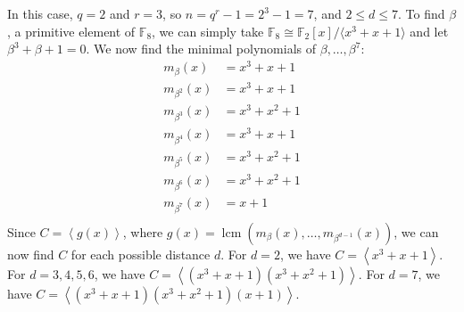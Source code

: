\documentclass[11pt]{article}
\DeclareMathOperator{\lcm}{lcm}
\def\F{\mathbb{F}}
\begin{document}
\section{} %
In this case, $q=2$ and $r=3$, so $n=q^r-1=2^3-1=7$, and $2\le d\le7$.
To find $\beta$, a primitive element of $\F_8$, we can simply take $\F_8\cong\F_2\left[x\right]/\langle x^3+x+1\rangle$ and let $\beta^3+\beta+1=0$.
\newline
\newline
We now find the minimal polynomials of $\beta,\ldots,\beta^7$:
\begin{align*}
	m_\beta(x) &= x^3+x+1\\
	m_{\beta^2}(x) &= x^3+x+1\\
	m_{\beta^3}(x) &= x^3+x^2+1\\
	m_{\beta^4}(x) &= x^3+x+1\\
	m_{\beta^5}(x) &= x^3+x^2+1\\
	m_{\beta^6}(x) &= x^3+x^2+1\\
	m_{\beta^7}(x) &= x+1\\
\end{align*}
\newline
\newline
Since $C=\left\langle g(x)\right\rangle$, where $g(x)=\lcm(m_\beta(x),\ldots,m_{\beta^{d-1}}(x))$, we can now find $C$ for each possible distance $d$.
\newline
\newline
For $d=2$, we have $C=\left\langle x^3+x+1\right\rangle$.
For $d=3,4,5,6$, we have $C=\left\langle (x^3+x+1)(x^3+x^2+1)\right\rangle$.
For $d=7$, we have $C=\left\langle(x^3+x+1)(x^3+x^2+1)(x+1)\right\rangle$.
\end{document}
